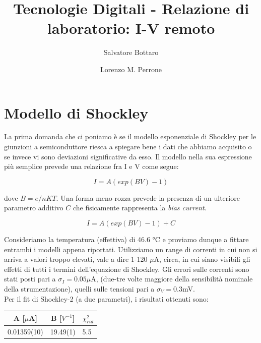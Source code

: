 \documentclass[a4paper]{article}
\begin{document}
\title{Tecnologie Digitali - Relazione di laboratorio: I-V remoto}
	\author[1]{Salvatore Bottaro}
		\author[2]{Lorenzo M. Perrone}
	\maketitle

\section{Modello di Shockley}
La prima domanda che ci poniamo è se il modello esponenziale di Shockley per le giunzioni a semiconduttore riesca a spiegare bene i dati che abbiamo acquisito o se invece vi sono deviazioni significative da esso. Il modello nella sua espressione più semplice prevede una relazione fra I e V come segue:

\begin{equation}
I = A \left( exp(BV)-1 \right)
\end{equation}

dove $B = e/nKT$. Una forma meno rozza prevede la presenza di un ulteriore parametro additivo $C$ che fisicamente rappresenta la \textit{bias current}.

\begin{equation}
I = A \left( exp(BV)-1 \right) + C
\end{equation}

Consideriamo la temperatura (effettiva) di 46.6 °C e proviamo dunque a fittare entrambi i modelli appena riportati. Utilizziamo un range di correnti in cui non si arriva a valori troppo elevati, vale a dire 1-120 $\mu$A, circa, in cui siano visibili gli effetti di tutti i termini dell'equazione di Shockley. Gli errori sulle correnti sono stati posti pari a $\sigma_I = 0.05 \mu$A, (due-tre volte maggiore della sensibilità nominale della strumentazione), quelli sulle tensioni pari a $\sigma_V = 0.3$mV.\\
Per il fit di Shockley-2 (a due parametri), i risultati ottenuti sono:

\begin{table}[h]
\centering
\begin{tabular}{c|c|l}
 \textbf{A} [$\mu$A] & \textbf{B} [$V^{-1}$] & $\chi_{rid}^2$\\ 
\hline 0.01359(10) & 19.49(1) & 5.5 \\ 
\end{tabular} 
\end{table}
~\\
\end{document}
